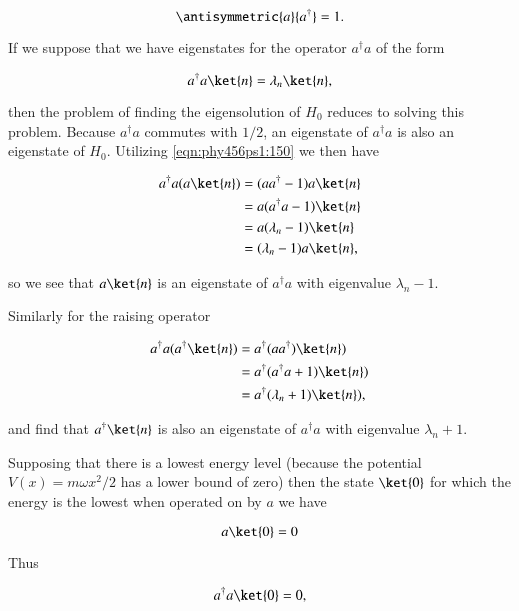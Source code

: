 \begin{equation}\label{eqn:phy456ps1:150}
\antisymmetric{a}{a^\dagger} = 1.
\end{equation}

If we suppose that we have eigenstates for the operator $a^\dagger a$ of the form

\begin{equation}\label{eqn:phy456ps1:200}
a^\dagger a \ket{n} = \lambda_n \ket{n},
\end{equation}

then the problem of finding the eigensolution of $H_0$ reduces to solving this problem.  Because $a^\dagger a$ commutes with $1/2$, an eigenstate of $a^\dagger a$ is also an eigenstate of $H_0$.  Utilizing \ref{eqn:phy456ps1:150} we then have

\begin{align*}
a^\dagger a ( a \ket{n} )
&= (a a^\dagger - 1 ) a \ket{n} \\
&= a (a^\dagger a - 1 ) \ket{n} \\
&= a (\lambda_n - 1 ) \ket{n} \\
&= (\lambda_n - 1 ) a \ket{n},
\end{align*}

so we see that $a \ket{n}$ is an eigenstate of $a^\dagger a$ with eigenvalue $\lambda_n - 1$.

Similarly for the raising operator

\begin{align*}
a^\dagger a ( a^\dagger \ket{n} )
&=
a^\dagger (a  a^\dagger) \ket{n} ) \\
&=
a^\dagger (a^\dagger a + 1) \ket{n} ) \\
&=
a^\dagger (\lambda_n + 1) \ket{n} ),
\end{align*}

and find that $a^\dagger \ket{n}$ is also an eigenstate of $a^\dagger a$ with eigenvalue $\lambda_n + 1$.

Supposing that there is a lowest energy level (because the potential $V(x) = m \omega x^2 /2$ has a lower bound of zero) then the state $\ket{0}$ for which the energy is the lowest when operated on by $a$ we have

\begin{equation}\label{eqn:phy456ps1:220}
a \ket{0} = 0
\end{equation}

Thus

\begin{equation}\label{eqn:phy456ps1:240}
a^\dagger a \ket{0} = 0,
\end{equation}

